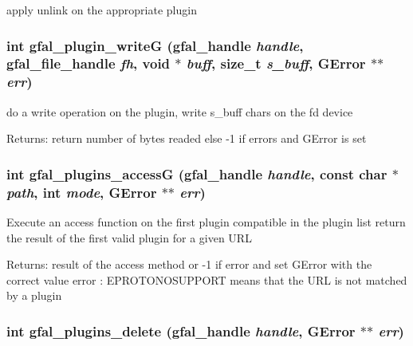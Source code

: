 apply unlink on the appropriate plugin 
\subsubsection{\setlength{\rightskip}{0pt plus 5cm}int gfal\_\-plugin\_\-write\-G (gfal\_\-handle {\em handle}, gfal\_\-file\_\-handle {\em fh}, void $\ast$ {\em buff}, size\_\-t {\em s\_\-buff}, GError $\ast$$\ast$ {\em err})}\label{gfal__common__plugin_8c_caaf6298a84f453bb6ddd50c36b6dfd7}


do a write operation on the plugin, write s\_\-buff chars on the fd device \begin{Desc}
\item[Returns:]return number of bytes readed else -1 if errors and GError is set \end{Desc}
\subsubsection{\setlength{\rightskip}{0pt plus 5cm}int gfal\_\-plugins\_\-access\-G (gfal\_\-handle {\em handle}, const char $\ast$ {\em path}, int {\em mode}, GError $\ast$$\ast$ {\em err})}\label{gfal__common__plugin_8c_b59f407ec7865163a60faaa56cbae432}


Execute an access function on the first plugin compatible in the plugin list return the result of the first valid plugin for a given URL \begin{Desc}
\item[Returns:]result of the access method or -1 if error and set GError with the correct value error : EPROTONOSUPPORT means that the URL is not matched by a plugin \end{Desc}
\subsubsection{\setlength{\rightskip}{0pt plus 5cm}int gfal\_\-plugins\_\-delete (gfal\_\-handle {\em handle}, GError $\ast$$\ast$ {\em err})}\label{gfal__common__plugin_8c_3a5fd910584fad43a1a67c0e844ce528}


